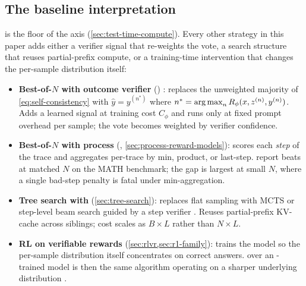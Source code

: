 \subsection{The baseline interpretation}
\label{sec:sc-baseline}

 is the floor of the  axis
(\cref{sec:test-time-compute}). Every other strategy in this paper
adds either a verifier signal that re-weights the vote, a search
structure that reuses partial-prefix compute, or a training-time
intervention that changes the per-sample distribution itself:

\begin{itemize}
\item \textbf{Best-of-$N$ with outcome verifier} ()
\citep[\S 2]{lightman2023-prm800k}: replaces the unweighted majority of
\cref{eq:self-consistency} with $\hat y = y^{(n^*)}$ where $n^* =
\operatorname*{arg\,max}_n R_\phi(x, z^{(n)}, y^{(n)})$. Adds a learned signal at
training cost $C_\phi$ and runs only at fixed prompt overhead per
sample; the vote becomes weighted by verifier confidence.

\item \textbf{Best-of-$N$ with process } (, \cref{sec:process-reward-models}):
scores each \emph{step} of the trace and aggregates per-trace by min,
product, or last-step. \citet[\S 4]{lightman2023-prm800k} report 
beats  at matched $N$ on the MATH benchmark; the gap is largest
at small $N$, where a single bad-step penalty is fatal under
min-aggregation.

\item \textbf{Tree search with } (\cref{sec:tree-search}): replaces
flat sampling with MCTS or step-level beam search guided by a step
verifier \citep[\S 3]{rstar-math2025}. Reuses partial-prefix KV-cache
across siblings; cost scales as $B \times L$ rather than $N \times L$.

\item \textbf{RL on verifiable rewards} (\cref{sec:rlvr,sec:r1-family}):
trains the model so the per-sample distribution itself concentrates on
correct answers.  over an -trained model is then
the same algorithm operating on a sharper underlying distribution
\citep[\S 2.3]{deepseek-r1}.
\end{itemize}

